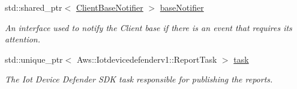 \begin{DoxyCompactItemize}
std\+::shared\+\_\+ptr$<$ \hyperlink{class_aws_1_1_iot_1_1_device_client_1_1_client_base_notifier}{Client\+Base\+Notifier} $>$ \hyperlink{class_aws_1_1_iot_1_1_device_client_1_1_device_defender_1_1_device_defender_feature_aa2f55fc2a35b656301cf0039f09bc408}{base\+Notifier}
\begin{DoxyCompactList}\small\item\em An interface used to notify the Client base if there is an event that requires its attention. \end{DoxyCompactList}\item 
\mbox{\label{class_aws_1_1_iot_1_1_device_client_1_1_device_defender_1_1_device_defender_feature_a76a601d0e3709a5984e7922721a30619}} 
std\+::unique\+\_\+ptr$<$ Aws\+::\+Iotdevicedefenderv1\+::\+Report\+Task $>$ \hyperlink{class_aws_1_1_iot_1_1_device_client_1_1_device_defender_1_1_device_defender_feature_a76a601d0e3709a5984e7922721a30619}{task}
\begin{DoxyCompactList}\small\item\em The Iot Device Defender S\+DK task responsible for publishing the reports. \end{DoxyCompactList}\end{DoxyCompactItemize}
